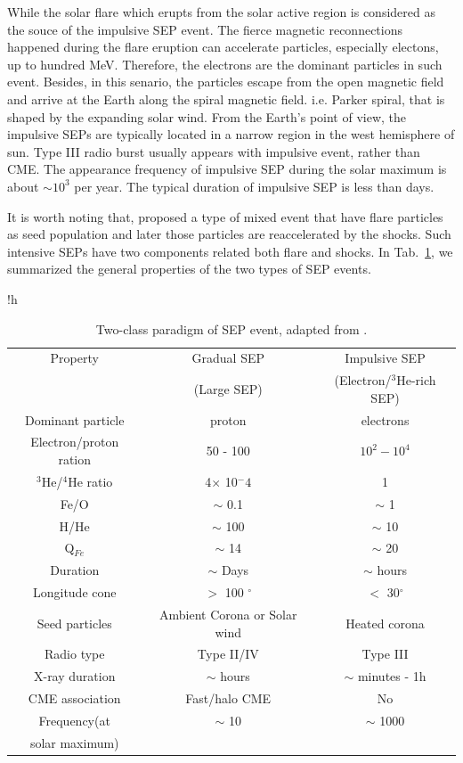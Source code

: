 While the solar flare which erupts from the solar active region is considered as the souce of the impulsive \ac{SEP} event. The fierce magnetic reconnections happened during the flare eruption can accelerate particles, especially electons, up to hundred MeV. Therefore, the electrons are the dominant particles in such event. Besides, in this senario, the particles escape from the open magnetic field and arrive at the Earth along the spiral magnetic field. i.e. Parker spiral, \citep{Parker-1958} that is shaped by the expanding solar wind. From the Earth's point of view, the impulsive \acp{SEP} are typically located in a narrow region in the west hemisphere of sun. Type III radio burst usually appears with impulsive event, rather than \ac{CME}.
The appearance frequency of impulsive \ac{SEP} during the solar maximum is about $\sim 10^3$ per year. The typical duration of impulsive \ac{SEP} is less than days.

It is worth noting that, \citep{cane2003two} proposed a type of mixed event that have flare particles as seed population and later those particles are reaccelerated by the shocks. Such intensive \acp{SEP} have two components related both flare and shocks.  %
In Tab.~\ref{Tab:Two_type_SEP}, we summarized the general properties of the two types of \ac{SEP} events.

\begin{table}{!h}
	\centering
	\caption[Two classes of SEP events]{Two-class paradigm of \ac{SEP} event, adapted from \citet{kallenrode2003current,	Desai_Diacalone2016LRSP, Wang2009}.}
	\begin{tabular}{c|c|c}
		\hline
		\hline
		Property 	& Gradual \ac{SEP} 	& Impulsive \ac{SEP} \\
					& (Large \ac{SEP})	& (Electron/$^3$He-rich \ac{SEP}) \\
		\hline
		Dominant particle	& proton	& electrons \\
		Electron/proton ration &  50 - 100 &  $10^2 - 10^4$  \\
		$^3$He/$^4$He ratio	& 4$\times$ 10$^-4$ & 1 \\
		Fe/O			& $\sim$ 0.1			& $\sim$ 1	 \\
		H/He		 	& $\sim$ 100			& $\sim$ 10 \\
		Q$_{Fe}$		& $\sim$ 14 			& $\sim$ 20 \\
		Duration		& $\sim$ Days			& $\sim$ hours \\
		Longitude cone	& $>$ 100 $^\circ$		& $<$ 30$^\circ$ \\
		Seed particles	& Ambient Corona or Solar wind & Heated corona \\
		Radio type		& Type II/IV	& Type III \\
		X-ray duration	& $\sim$ hours	& $\sim$ minutes - 1h \\
		CME association	& Fast/halo CME	& No	\\
		Frequency(at 	& $\sim$ 10	& $\sim$ 1000 \\
		solar maximum)	& 	& 	\\
		\hline
	\end{tabular}
	\label{Tab:Two_type_SEP}
\end{table}


